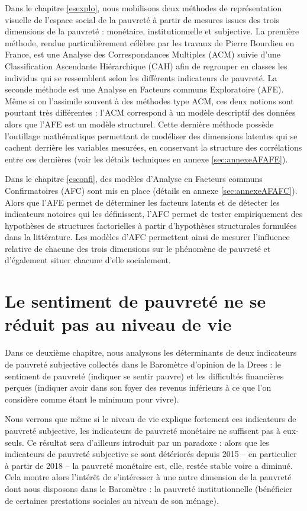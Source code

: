 \documentclass[12pt,a4paper]{reedthesis}
\begin{document}
Dans le chapitre \ref{esexplo}, nous mobilisons deux méthodes de représentation visuelle de l'espace social de la pauvreté à partir de mesures issues des trois dimensions de la pauvreté : monétaire, institutionnelle et subjective. La première méthode, rendue particulièrement célèbre par les travaux de Pierre Bourdieu en France, est une Analyse des Correspondances Multiples (ACM) suivie d'une Classification Ascendante Hiérarchique (CAH) afin de regrouper en classes les individus qui se ressemblent selon les différents indicateurs de pauvreté. La seconde méthode est une Analyse en Facteurs communs Exploratoire (AFE). Même si on l'assimile souvent à des méthodes type ACM, ces deux notions sont pourtant très différentes : l'ACM correspond à un modèle descriptif des données alors que l'AFE est un modèle structurel. Cette dernière méthode possède l'outillage mathématique permettant de modéliser des dimensions latentes qui se cachent derrière les variables mesurées, en conservant la structure des corrélations entre ces dernières (voir les détails techniques en annexe \ref{sec:annexeAFAFE}).

Dans le chapitre \ref{esconfi}, des modèles d'Analyse en Facteurs communs Confirmatoires (AFC) sont mis en place (détails en annexe \ref{sec:annexeAFAFC}). Alors que l'AFE permet de déterminer les facteurs latents et de détecter les indicateurs notoires qui les définissent, l'AFC permet de tester empiriquement des hypothèses de structures factorielles à partir d'hypothèses structurales formulées dans la littérature. Les modèles d'AFC permettent ainsi de mesurer l'influence relative de chacune des trois dimensions sur le phénomène de pauvreté et d'également situer chacune d'elle socialement.

\hypertarget{nonreducnv}{%
\chapter{Le sentiment de pauvreté ne se réduit pas au niveau de vie}\label{nonreducnv}}

Dans ce deuxième chapitre, nous analysons les déterminants de deux indicateurs de pauvreté subjective collectés dans le Baromètre d'opinion de la Drees : le sentiment de pauvreté (indiquer se sentir pauvre) et les difficultés financières perçues (indiquer avoir dans son foyer des revenus inférieurs à ce que l'on considère comme étant le minimum pour vivre).

Nous verrons que même si le niveau de vie explique fortement ces indicateurs de pauvreté subjective, les indicateurs de pauvreté monétaire ne suffisent pas à eux-seuls. Ce résultat sera d'ailleurs introduit par un paradoxe : alors que les indicateurs de pauvreté subjective se sont détériorés depuis 2015 -- en particulier à partir de 2018 -- la pauvreté monétaire est, elle, restée stable voire a diminué. Cela montre alors l'intérêt de s'intéresser à une autre dimension de la pauvreté dont nous disposons dans le Baromètre : la pauvreté institutionnelle (bénéficier de certaines prestations sociales au niveau de son ménage).
\end{document}
